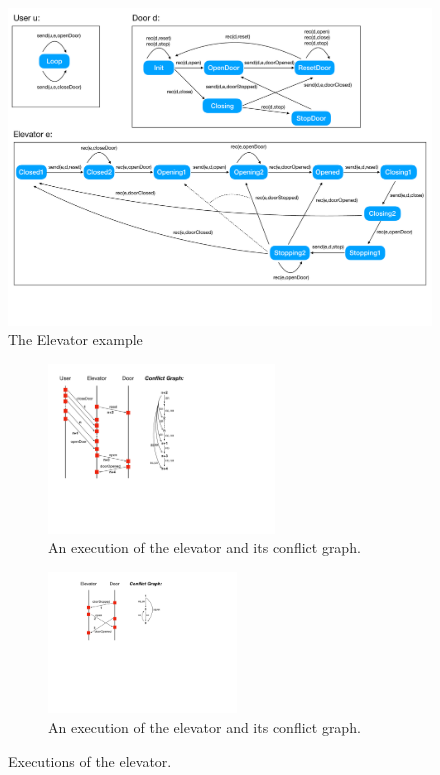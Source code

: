 \begin{figure}
\includegraphics[width=13cm]{elevator.pdf}
\caption{The Elevator example}
\label{fig:elevator}
\end{figure}

\begin{figure}
\begin{subfigure}[t]{6cm}
\includegraphics[width=6cm]{MSC-elevator1.pdf}
\caption{An execution of the elevator and its conflict graph.}
\label{fig:elevator-exec1}
\end{subfigure}
\hspace{1cm}
\begin{subfigure}[t]{5cm}
\includegraphics[width=5cm]{MSC-elevator2.pdf}
\caption{An execution of the elevator and its conflict graph.}
\label{fig:elevator-exec1}
\end{subfigure}
\caption{Executions of the elevator.}
\label{fig:elevator-exec}
\end{figure}

